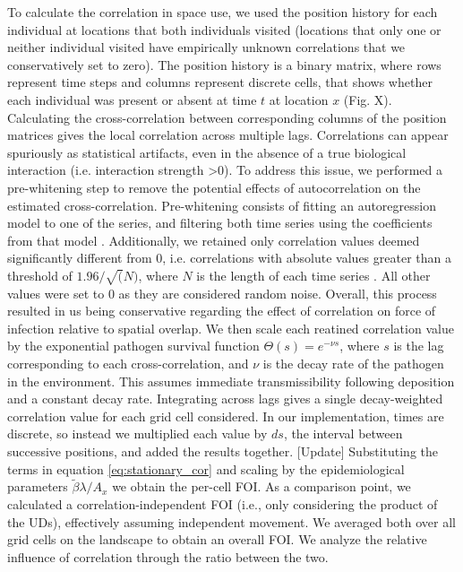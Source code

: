 ﻿\documentclass[11pt]{article}
\begin{document}
To calculate the correlation in space use, we used the position history for each individual at locations that both individuals visited (locations that only one or neither individual visited have empirically unknown correlations that we conservatively set to zero). The position history is a binary matrix, where rows represent time steps and columns represent discrete cells, that shows whether each individual was present or absent at time $t$ at location $x$ (Fig. X). Calculating the cross-correlation between corresponding columns of the position matrices gives the local correlation across multiple lags. %
Correlations can appear spuriously as statistical artifacts, even in the absence of a true biological interaction (i.e. interaction strength >0). To address this issue, we performed a pre-whitening step to remove the potential effects of autocorrelation on the estimated cross-correlation. Pre-whitening consists of fitting an autoregression model to one of the series, and filtering both time series using the coefficients from that model \citep{Dean2016}. Additionally, we retained only correlation values deemed significantly different from 0, i.e. correlations with absolute values greater than a threshold of $1.96/\sqrt(N)$, where $N$ is the length of each time series \citep{Dean2016}. All other values were set to 0 as they are considered random noise. Overall, this process resulted in us being conservative regarding the effect of correlation on force of infection relative to spatial overlap.
We then scale each reatined correlation value by the exponential pathogen survival function $\Theta(s) = e^{-\nu s}$, where $s$ is the lag corresponding to each cross-correlation, and $\nu$ is the decay rate of the pathogen in the environment. This assumes immediate transmissibility following deposition and a constant decay rate. Integrating across lags gives a single decay-weighted correlation value for each grid cell considered. In our implementation, times are discrete, so instead we multiplied each value by $ds$, the interval between successive positions, and added the results together. [Update] Substituting the terms in equation \ref{eq:stationary_cor} and scaling by the epidemiological parameters $\tilde\beta\lambda/ A_x$ we obtain the per-cell FOI. As a comparison point, we calculated a correlation-independent FOI (i.e., only considering the product of the UDs), effectively assuming independent movement. We averaged both over all grid cells on the landscape to obtain an overall FOI. We analyze the relative influence of correlation through the ratio between the two. 
\end{document}
